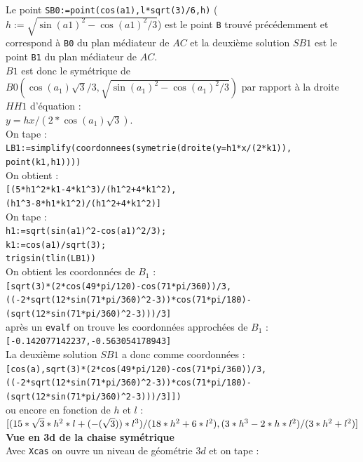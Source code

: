 \documentclass[a4paper,11pt]{book}
\begin{document}
\begin{itemize}
Le point {\tt SB0:=point(cos(a1),l*sqrt(3)/6,h)} 
($h:=\sqrt{\sin(a1)^2-\cos(a1)^2/3}$) est le point {\tt B} trouv\'e 
pr\'ec\'edemment et correspond \`a {\tt B0} du plan m\'ediateur de $AC$ et la 
deuxi\`eme solution $SB1$ est le point {\tt B1} du plan m\'ediateur
de $AC$. \\
$B1$ est donc le sym\'etrique de $B0 (\cos(a_1)\sqrt 3/3,\sqrt{\sin(a_1)^2-\cos(a_1)^2/3})$ par rapport \`a la droite $HH1$ d'\'equation :\\
$y=hx/(2*\cos(a_1)\sqrt 3)$.\\
On tape :\\
{\tt LB1:=simplify(coordonnees(symetrie(droite(y=h1*x/(2*k1)), point(k1,h1))))}\\
On obtient :\\
{\tt [(5*h1\verb|^|2*k1-4*k1\verb|^|3)/(h1\verb|^|2+4*k1\verb|^|2),\\
(h1\verb|^|3-8*h1*k1\verb|^|2)/(h1\verb|^|2+4*k1\verb|^|2)]}\\
On tape :\\
{\tt h1:=sqrt(sin(a1)\verb|^|2-cos(a1)\verb|^|2/3);}\\
{\tt k1:=cos(a1)/sqrt(3);}\\
{\tt trigsin(tlin(LB1))}\\
On obtient les coordonn\'ees de $B_1$ :\\
{\tt [sqrt(3)*(2*cos(49*pi/120)-cos(71*pi/360))/3,}\\
{\tt ((-2*sqrt(12*sin(71*pi/360)\verb|^|2-3))*cos(71*pi/180)-\\
(sqrt(12*sin(71*pi/360)\verb|^|2-3)))/3]}\\
apr\`es un {\tt evalf} on trouve les coordonn\'ees approch\'ees de $B_1$ :\\
{\tt [-0.142077142237,-0.563054178943]}\\
La deuxi\`eme solution $SB1$ a donc comme coordonn\'ees :\\
{\tt [cos(a),sqrt(3)*(2*cos(49*pi/120)-cos(71*pi/360))/3,\\
((-2*sqrt(12*sin(71*pi/360)\verb|^|2-3))*cos(71*pi/180)-\\
(sqrt(12*sin(71*pi/360)\verb|^|2-3)))/3]])}\\
ou encore en fonction de $h$ et $l$ :\\
$[(15*\sqrt 3*h^2*l+(-(\sqrt 3))*l^3)/(18*h^2+6*l^2),\\
(3*h^3-2*h*l^2)/(3*h^2+l^2)] $\\
{\bf Vue en 3d de la chaise sym\'etrique}\\
Avec {\tt Xcas} on ouvre un niveau de g\'eom\'etrie $3d$ et on tape :

\end{itemize}
\end{document}

